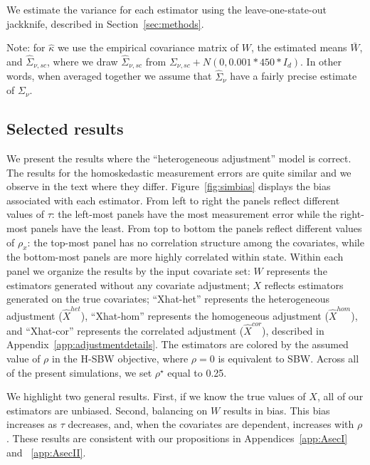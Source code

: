We estimate the variance for each estimator using the leave-one-state-out jackknife, described in Section~\ref{sec:methods}. 

Note: for $\hat{\kappa}$ we use the empirical covariance matrix of $W$, the estimated means $\bar{W}$, and $\hat{\Sigma}_{\nu, sc}$, where we draw $\hat{\Sigma}_{\nu, sc}$ from $\Sigma_{\nu, sc} + N(0, 0.001*450*I_d)$. In other words, when averaged together we assume that $\hat{\Sigma}_{\nu}$ have a fairly precise estimate of $\Sigma_{\nu}$.

\subsection{Selected results}\label{ssec:resultsI}

We present the results where the ``heterogeneous adjustment'' model is correct. The results for the homoskedastic measurement errors are quite similar and we observe in the text where they differ. Figure~\ref{fig:simbias} displays the bias associated with each estimator. From left to right the panels reflect different values of $\tau$: the left-most panels have the most measurement error while the right-most panels have the least. From top to bottom the panels reflect different values of $\rho_x$: the top-most panel has no correlation structure among the covariates, while the bottom-most panels are more highly correlated within state. Within each panel we organize the results by the input covariate set: $W$ represents the estimators generated without any covariate adjustment; $X$ reflects estimators generated on the true covariates; ``Xhat-het'' represents the heterogeneous adjustment ($\hat{X}^{het}$), ``Xhat-hom'' represents the homogeneous adjustment ($\hat{X}^{hom}$), and ``Xhat-cor'' represents the correlated adjustment ($\hat{X}^{cor}$), described in Appendix~\ref{app:adjustmentdetails}. The estimators are colored by the assumed value of $\rho$ in the H-SBW objective, where $\rho = 0$ is equivalent to SBW. Across all of the present simulations, we set $\rho^\star$ equal to 0.25.

We highlight two general results. First, if we know the true values of $X$, all of our estimators are unbiased. Second, balancing on $W$ results in bias. This bias increases as $\tau$ decreases, and, when the covariates are dependent, increases with $\rho$. These results are consistent with our propositions in Appendices~\ref{app:AsecI} and ~\ref{app:AsecII}.

